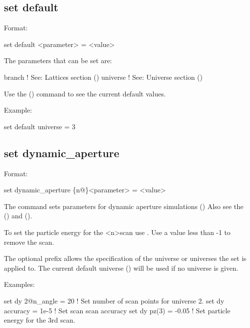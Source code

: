 {{\subsection{set default}
\label{s:set.default}

Format:
\begin{example}
  set default <parameter> = <value>
\end{example}

The parameters that can be set are:
\begin{example}
  branch            ! See: Lattices section ()
  universe          ! See: Universe section ()
\end{example}

Use the  () command to see the current
default values.

Example:
\begin{example}
  set default universe = 3
\end{example}


\subsection{set dynamic_aperture}
\label{s:set.da}

Format:
\begin{example}
  set dynamic_aperture \{n@\}<parameter> = <value>
\end{example}

The  command sets parameters for dynamic aperture simulations
() Also see the  () and
 ().

To set the particle energy for the <n>\Th scan use . Use a value less than -1 to remove
the scan.

The optional  prefix allows the specification of the universe or universes the set is applied
to. The current default universe () will be used if no universe is given.

Examples:
\begin{example}
  set dy 2@n_angle = 20   ! Set number of scan points for universe 2.
  set dy accuracy = 1e-5  ! Set scan scan accuracy
  set dy pz(3) = -0.05    ! Set particle energy for the 3rd scan.
\end{example}

}}
